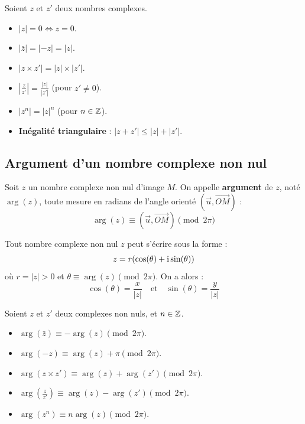 \begin{propriete}
Soient $z$ et $z'$ deux nombres complexes.
\begin{itemize}
    \item $|z| = 0 \iff z = 0$.
    \item $|\bar{z}| = |-z| = |z|$.
    \item $|z \times z'| = |z| \times |z'|$.
    \item $\left|\frac{z}{z'}\right| = \frac{|z|}{|z'|}$ \quad (pour $z' \ne 0$).
    \item $|z^n| = |z|^n$ \quad (pour $n \in \mathbb{Z}$).
    \item \textbf{Inégalité triangulaire} : $|z + z'| \le |z| + |z'|$.
\end{itemize}
\end{propriete}

\subsection{Argument d'un nombre complexe non nul}

\begin{definition}[Argument]
Soit $z$ un nombre complexe non nul d'image $M$.
On appelle \textbf{argument} de $z$, noté $\arg(z)$, toute mesure en radians de l'angle orienté $(\vec{u}, \vec{OM})$ :
\[
\arg(z) \equiv (\vec{u}, \vec{OM}) \pmod{2\pi}
\]
\end{definition}

\begin{propriete}
Tout nombre complexe non nul $z$ peut s'écrire sous la forme :
\[
z = r(\cos(\theta) + \mathrm{i} \sin(\theta))
\]
où $r = |z| > 0$ et $\theta \equiv \arg(z) \pmod{2\pi}$.
On a alors :
\[
\cos(\theta) = \frac{x}{|z|} \quad \text{et} \quad \sin(\theta) = \frac{y}{|z|}
\]
\end{propriete}

\begin{propriete}
Soient $z$ et $z'$ deux complexes non nuls, et $n \in \mathbb{Z}$.
\begin{itemize}
    \item $\arg(\bar{z}) \equiv -\arg(z) \pmod{2\pi}$.
    \item $\arg(-z) \equiv \arg(z) + \pi \pmod{2\pi}$.
    \item $\arg(z \times z') \equiv \arg(z) + \arg(z') \pmod{2\pi}$.
    \item $\arg\left(\frac{z}{z'}\right) \equiv \arg(z) - \arg(z') \pmod{2\pi}$.
    \item $\arg(z^n) \equiv n\arg(z) \pmod{2\pi}$.
\end{itemize}
\end{propriete}

